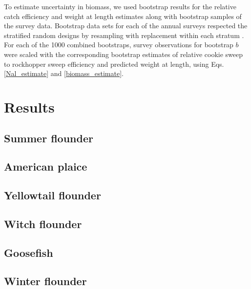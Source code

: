 \documentclass[]{article}
\begin{document}
To estimate uncertainty in biomass, we used bootstrap results for the
relative catch efficiency and weight at length estimates along with
bootstrap samples of the survey data. Bootstrap data sets for each of
the annual surveys respected the stratified random designs by resampling
with replacement within each stratum \citep{smith97}. For each of the
1000 combined bootstraps, survey observations for bootstrap \(b\) were
scaled with the corresponding bootstrap estimates of relative cookie
sweep to rockhopper sweep efficiency and predicted weight at length,
using Eqs. \ref{Nal_estimate} and \ref{biomass_estimate}.

\hypertarget{results}{%
\section{Results}\label{results}}

\hypertarget{summer-flounder}{%
\subsection{Summer flounder}\label{summer-flounder}}

\hypertarget{american-plaice}{%
\subsection{American plaice}\label{american-plaice}}

\hypertarget{yellowtail-flounder}{%
\subsection{Yellowtail flounder}\label{yellowtail-flounder}}

\hypertarget{witch-flounder}{%
\subsection{Witch flounder}\label{witch-flounder}}

\hypertarget{goosefish}{%
\subsection{Goosefish}\label{goosefish}}

\hypertarget{winter-flounder}{%
\subsection{Winter flounder}\label{winter-flounder}}
\end{document}
